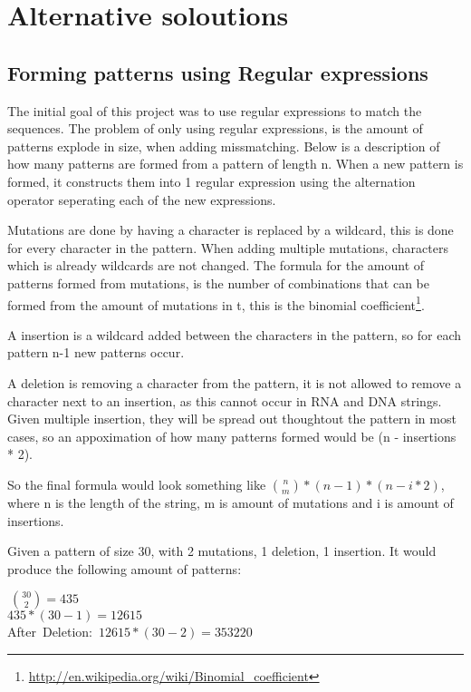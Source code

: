 \section{Alternative soloutions}
\subsection{Forming patterns using Regular expressions}
The initial goal of this project was to use regular expressions to match the sequences. The problem of only using regular expressions, is the amount of patterns explode in size, when adding missmatching. Below is a description of how many patterns are formed from a pattern of length n. When a new pattern is formed, it constructs them into 1 regular expression using the alternation operator seperating each of the new expressions. 

Mutations are done by having a character is replaced by a wildcard, this is done for every character in the pattern. When adding multiple mutations, characters which is already wildcards are not changed. The formula for the amount of patterns formed from mutations, is the number of combinations that can be formed from the amount of mutations in t, this is the binomial coefficient\footnote{\url{http://en.wikipedia.org/wiki/Binomial_coefficient}}. 

A insertion is a wildcard added between the characters in the pattern, so for each pattern n-1 new patterns occur.

A deletion is removing a character from the pattern, it is not allowed to remove a character next to an insertion, as this cannot occur in RNA and DNA strings. Given multiple insertion, they will be spread out thoughtout the pattern in most cases, so an appoximation of how many patterns formed would be (n - insertions * 2).

So the final formula would look something like ${n \choose m}*(n-1)*(n-i*2)$, where n is the length of the string, m is amount of mutations and i is amount of insertions.


\begin{myex}\label{altreg}
Given a pattern of size 30, with 2 mutations, 1 deletion, 1 insertion. It would produce the following amount of patterns: \\
\begin{center}
 $~{30 \choose 2} = 435$\\
 $435 * (30-1) = 12615$\\
After~Deletion:~$12615*(30-2) = 353220$
\end{center}
\end{myex}

